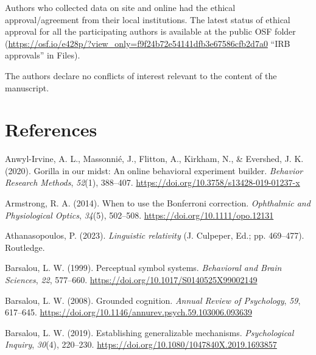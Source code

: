 \documentclass[
  man,mask,floatsintext]{apa7}
\newlength{\cslhangindent}
\newlength{\cslentryspacingunit} %
\newenvironment{CSLReferences}[2] %
 {%
  \setlength{\parindent}{0pt}
  \ifodd #1
  \let\oldpar\par
  \def\par{\hangindent=\cslhangindent\oldpar}
  \fi
  \setlength{\parskip}{#2\cslentryspacingunit}
 }%
 {}
\begin{document}
Authors who collected data on site and online had the ethical approval/agreement from their local institutions. The latest status of ethical approval for all the participating authors is available at the public OSF folder (\url{https://osf.io/e428p/?view_only=f9f24b72e54141dfb3e67586cfb2d7a0} ``IRB approvals'' in Files).

The authors declare no conflicts of interest relevant to the content of the manuscript.

\newpage

\hypertarget{references}{%
\section{References}\label{references}}

\hypertarget{refs}{}
\begin{CSLReferences}{1}{0}
\leavevmode{}%
Anwyl-Irvine, A. L., Massonnié, J., Flitton, A., Kirkham, N., \& Evershed, J. K. (2020). Gorilla in our midst: {An} online behavioral experiment builder. \emph{Behavior Research Methods}, \emph{52}(1), 388--407. \url{https://doi.org/10.3758/s13428-019-01237-x}

\leavevmode{}%
Armstrong, R. A. (2014). When to use the {Bonferroni} correction. \emph{Ophthalmic and Physiological Optics}, \emph{34}(5), 502--508. \url{https://doi.org/10.1111/opo.12131}

\leavevmode{}%
Athanasopoulos, P. (2023). \emph{Linguistic relativity} (J. Culpeper, Ed.; pp. 469--477). Routledge.

\leavevmode{}%
Barsalou, L. W. (1999). Perceptual symbol systems. \emph{Behavioral and Brain Sciences}, \emph{22}, 577--660. \url{https://doi.org/10.1017/S0140525X99002149}

\leavevmode{}%
Barsalou, L. W. (2008). Grounded cognition. \emph{Annual Review of Psychology}, \emph{59}, 617--645. \url{https://doi.org/10.1146/annurev.psych.59.103006.093639}

\leavevmode{}%
Barsalou, L. W. (2019). Establishing generalizable mechanisms. \emph{Psychological Inquiry}, \emph{30}(4), 220--230. \url{https://doi.org/10.1080/1047840X.2019.1693857}


\end{CSLReferences}
\end{document}
